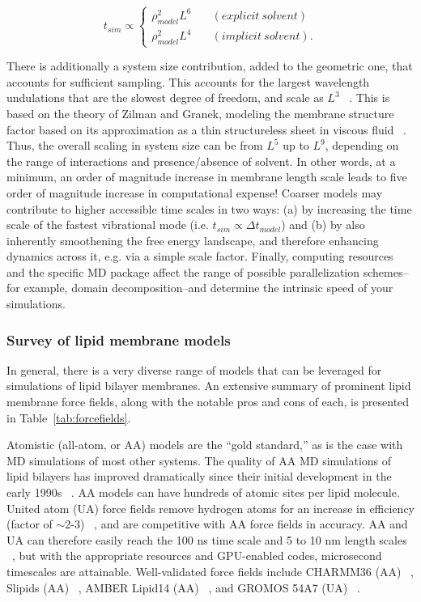 \documentclass[9pt,bestpractices,pubversion]{livecoms}
\begin{document}
\begin{equation}\label{eq:16}
	t_{sim} \propto \left\{
       		 \begin{array}{ll}
            		\rho_{model}^2 L^6 & \quad (explicit \: solvent) \\
            		\rho_{model}^2 L^4 & \quad (implicit \: solvent).
        		\end{array}
    	\right.
\end{equation}

There is additionally a system size contribution, added to the geometric one, that accounts for sufficient sampling.
This accounts for the largest wavelength undulations that are the slowest degree of freedom, and scale as $L^3$ ~\cite{Watson2010a}.
This is based on the theory of Zilman and Granek, modeling the membrane structure factor based on its approximation as a thin structureless sheet in viscous fluid ~\cite{Zilman2002,Zilman1996}.
Thus, the overall scaling in system size can be from $L^5$ up to $L^9$, depending on the range of interactions and presence/absence of solvent.
In other words, at a minimum, an order of magnitude increase in membrane length scale leads to five order of magnitude increase in computational expense!
Coarser models may contribute to higher accessible time scales in two ways: (a) by increasing the time scale of the fastest vibrational mode (i.e. $t_{sim} \propto \Delta t_{model}$) and (b) by also inherently smoothening the free energy landscape, and therefore enhancing dynamics across it, e.g. via a simple scale factor.
Finally, computing resources and the specific MD package affect the range of possible parallelization schemes--for example, domain decomposition--and determine the intrinsic speed of your simulations.

\subsubsection{Survey of lipid membrane models}
\label{subsubsec:modelsurvey}
In general, there is a very diverse range of models that can be leveraged for simulations of lipid bilayer membranes.
An extensive summary of prominent lipid membrane force fields, along with the notable pros and cons of each, is presented in Table~\ref{tab:forcefields}.

Atomistic (all-atom, or AA) models are the ``gold standard,'' as is the case with MD simulations of most other systems.
The quality of AA MD simulations of lipid bilayers has improved dramatically since their initial development in the early 1990s ~\cite{Venable2015}.
AA models can have hundreds of atomic sites per lipid molecule.
United atom (UA) force fields remove hydrogen atoms for an increase in efficiency (factor of $\sim$2-3) ~\cite{Lyubartsev2016}, and are competitive with AA force fields in accuracy.
AA and UA can therefore easily reach the 100 ns time scale and 5 to 10 nm length scales  ~\cite{Smirnova2015}, but with the appropriate resources and GPU-enabled codes, microsecond timescales are attainable.
Well-validated force fields include CHARMM36 (AA) ~\cite{Klauda2010d}, Slipids (AA) ~\cite{Jambeck2012}, AMBER Lipid14 (AA) ~\cite{Dickson2014}, and GROMOS 54A7 (UA) ~\cite{Poger2010a}.
\end{document}

